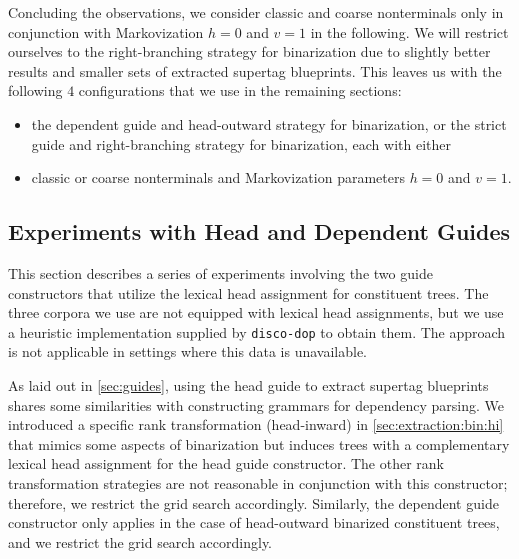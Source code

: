 \documentclass[../../document.tex]{subfiles}
\begin{document}
    Concluding the observations, we consider classic and coarse nonterminals only in conjunction with Markovization \(h=0\) and \(v=1\) in the following.
    We will restrict ourselves to the right-branching strategy for binarization due to slightly better results and smaller sets of extracted supertag blueprints.
    This leaves us with the following \(4\) configurations that we use in the remaining sections:
    \begin{itemize}
        \item the dependent guide and head-outward strategy for binarization, or the strict guide and right-branching strategy for binarization, each with either
        \item classic or coarse nonterminals and Markovization parameters \(h=0\) and \(v=1\).
    \end{itemize}

    \subsection{Experiments with Head and Dependent Guides}\label{sec:gridsearch:head}
    This section describes a series of experiments involving the two guide constructors that utilize the lexical head assignment for constituent trees.
    The three corpora we use are not equipped with lexical head assignments, but we use a heuristic implementation supplied by \texttt{disco-dop} to obtain them.
    The approach is not applicable in settings where this data is unavailable.

    As laid out in \cref{sec:guides}, using the head guide to extract supertag blueprints shares some similarities with constructing grammars for dependency parsing.
    We introduced a specific rank transformation (head-inward) in \cref{sec:extraction:bin:hi} that mimics some aspects of binarization but induces trees with a complementary lexical head assignment for the head guide constructor.
    The other rank transformation strategies are not reasonable in conjunction with this constructor; therefore, we restrict the grid search accordingly.
    Similarly, the dependent guide constructor only applies in the case of head-outward binarized constituent trees, and we restrict the grid search accordingly.
\end{document}
